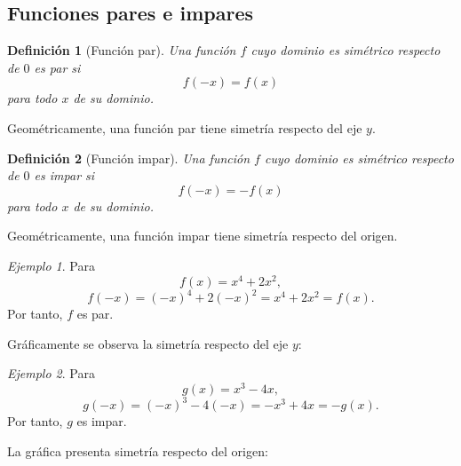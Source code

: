 \documentclass[12pt]{article}
\newtheorem{definicion}{Definición}[section]
\theoremstyle{remark}
\newtheorem{ejemplo}{Ejemplo}[section]
\begin{document}
\subsection*{Funciones pares e impares}
\begin{definicion}[Función par]
Una función $f$ cuyo dominio es simétrico respecto de $0$ es \emph{par} si
\[
f(-x)=f(x)
\]
para todo $x$ de su dominio.
\end{definicion}

Geométricamente, una función par tiene simetría respecto del eje $y$.

\begin{definicion}[Función impar]
Una función $f$ cuyo dominio es simétrico respecto de $0$ es \emph{impar} si
\[
f(-x)=-f(x)
\]
para todo $x$ de su dominio.
\end{definicion}

Geométricamente, una función impar tiene simetría respecto del origen.

\begin{ejemplo}
Para
\[
f(x)=x^4+2x^2,
\]
\[
f(-x)=(-x)^4+2(-x)^2=x^4+2x^2=f(x).
\]
Por tanto, $f$ es par.

Gráficamente se observa la simetría respecto del eje $y$:
\begin{center}
\end{center}
\end{ejemplo}

\begin{ejemplo}
Para
\[
g(x)=x^3-4x,
\]
\[
g(-x)=(-x)^3-4(-x)=-x^3+4x=-g(x).
\]
Por tanto, $g$ es impar.

La gráfica presenta simetría respecto del origen:
\begin{center}
\end{center}
\end{ejemplo}
\end{document}
